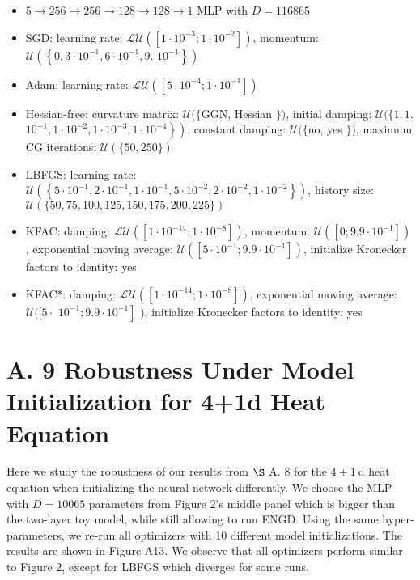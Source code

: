 \documentclass[10pt]{article}
\begin{document}
\begin{itemize}
  \item $5 \rightarrow 256 \rightarrow 256 \rightarrow 128 \rightarrow 128 \rightarrow 1$ MLP with $D=116865$
  \item SGD: learning rate: $\mathcal{L U}\left(\left[1 \cdot 10^{-3} ; 1 \cdot 10^{-2}\right]\right)$, momentum: $\mathcal{U}\left(\left\{0,3 \cdot 10^{-1}, 6 \cdot 10^{-1}, 9\right.\right.$. $\left.\left.10^{-1}\right\}\right)$
  \item Adam: learning rate: $\mathcal{L U}\left(\left[5 \cdot 10^{-4} ; 1 \cdot 10^{-1}\right]\right)$
  \item Hessian-free: curvature matrix: $\mathcal{U}(\{\mathrm{GGN}$, Hessian $\})$, initial damping: $\mathcal{U}(\{1,1$. $\left.\left.10^{-1}, 1 \cdot 10^{-2}, 1 \cdot 10^{-3}, 1 \cdot 10^{-4}\right\}\right)$, constant damping: $\mathcal{U}(\{\mathrm{no}$, yes $\})$, maximum CG iterations: $\mathcal{U}(\{50,250\})$
  \item LBFGS: learning rate: $\mathcal{U}\left(\left\{5 \cdot 10^{-1}, 2 \cdot 10^{-1}, 1 \cdot 10^{-1}, 5 \cdot 10^{-2}, 2 \cdot 10^{-2}, 1 \cdot 10^{-2}\right\}\right)$, history size: $\mathcal{U}(\{50,75,100,125,150,175,200,225\})$
  \item KFAC: damping: $\mathcal{L U}\left(\left[1 \cdot 10^{-14} ; 1 \cdot 10^{-8}\right]\right)$, momentum: $\mathcal{U}\left(\left[0 ; 9.9 \cdot 10^{-1}\right]\right)$, exponential moving average: $\mathcal{U}\left(\left[5 \cdot 10^{-1} ; 9.9 \cdot 10^{-1}\right]\right)$, initialize Kronecker factors to identity: yes
  \item KFAC*: damping: $\mathcal{L U}\left(\left[1 \cdot 10^{-14} ; 1 \cdot 10^{-8}\right]\right)$, exponential moving average: $\mathcal{U}([5 \cdot$ $\left.10^{-1} ; 9.9 \cdot 10^{-1}\right]$ ), initialize Kronecker factors to identity: yes
\end{itemize}

\section*{A. 9 Robustness Under Model Initialization for 4+1d Heat Equation}
Here we study the robustness of our results from $\S$ A. 8 for the $4+1 \mathrm{~d}$ heat equation when initializing the neural network differently. We choose the MLP with $D=10065$ parameters from Figure 2's middle panel which is bigger than the two-layer toy model, while still allowing to run ENGD. Using the same hyper-parameters, we re-run all optimizers with 10 different model initializations. The results are shown in Figure A13. We observe that all optimizers perform similar to Figure 2, except for LBFGS which diverges for some runs.
\end{document}
